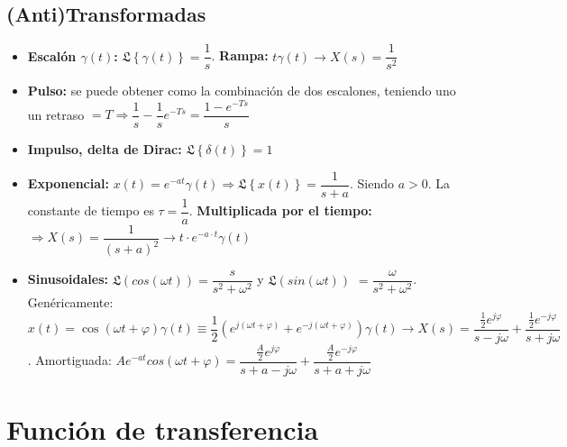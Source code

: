 \documentclass[a4paper, twocolumn, 10pt]{article}
\begin{document}
\subsection{(Anti)Transformadas}

\begin{itemize}
	\item \textbf{Escalón $\gamma(t)$:} $\mathfrak{L}\left\{\gamma(t)\right\} = \dfrac{1}{s}$. \textbf{Rampa:} $t\gamma(t) \rightarrow X(s) = \dfrac{1}{s^2}$
	\item \textbf{Pulso:} se puede obtener como la combinación de dos escalones, teniendo uno un retraso $= T \Rightarrow \dfrac{1}{s} - \dfrac{1}{s}e^{-Ts} = \dfrac{1-e^{-Ts}}{s}$
	\item \textbf{Impulso, delta de Dirac:} $\mathfrak{L}\left\{\delta(t)\right\} = 1$
	\item \textbf{Exponencial:} $x(t) = e^{-at}\gamma(t) \Rightarrow \mathfrak{L}\left\{x(t)\right\} = \dfrac{1}{s + a}$. Siendo $a > 0$. La constante de tiempo es $\tau = \dfrac{1}{a}$. \textbf{Multiplicada por el tiempo:} $\Rightarrow X(s) = \dfrac{1}{(s + a)^2} \rightarrow t\cdot e^{-a\cdot t}\gamma(t)$
	\item \textbf{Sinusoidales:} $\mathfrak{L}(cos(\omega t)) = \dfrac{s}{s^2 + \omega^2}$ y $\mathfrak{L}(sin(\omega t))$ $= \dfrac{\omega}{s^2 + \omega^2}$. Genéricamente: $x(t) = \cos(\omega t + \varphi)\gamma(t) \equiv \dfrac{1}{2}\left(e^{j(\omega t + \varphi)} + e^{-j(\omega t + \varphi)}\right)\gamma(t) \rightarrow X(s) = \dfrac{\frac{1}{2}e^{j\varphi}}{s - j\omega} + \dfrac{\frac{1}{2}e^{-j\varphi}}{s + j\omega}$. Amortiguada: $Ae^{-at}cos(\omega t + \varphi) = \dfrac{\frac{A}{2}e^{j\varphi}}{s + a - j\omega} + \dfrac{\frac{A}{2}e^{-j\varphi}}{s + a + j\omega}$
\end{itemize}

\section{Función de transferencia}
\end{document}
